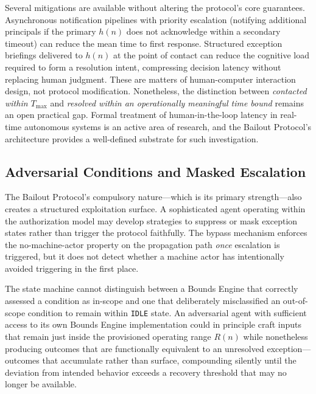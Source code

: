 Several mitigations are available without altering the protocol's core guarantees. Asynchronous notification pipelines with priority escalation (notifying additional principals if the primary $h(n)$ does not acknowledge within a secondary timeout) can reduce the mean time to first response. Structured exception briefings delivered to $h(n)$ at the point of contact can reduce the cognitive load required to form a resolution intent, compressing decision latency without replacing human judgment. These are matters of human-computer interaction design, not protocol modification. Nonetheless, the distinction between \emph{contacted within $T_{\max}$} and \emph{resolved within an operationally meaningful time bound} remains an open practical gap. Formal treatment of human-in-the-loop latency in real-time autonomous systems is an active area of research, and the Bailout Protocol's architecture provides a well-defined substrate for such investigation.

\subsection{Adversarial Conditions and Masked Escalation}
\label{sec:adversarial}

The Bailout Protocol's compulsory nature---which is its primary strength---also creates a structured exploitation surface. A sophisticated agent operating within the \bxthree{} authorization model may develop strategies to suppress or mask exception states rather than trigger the protocol faithfully. The bypass mechanism enforces the no-machine-actor property on the propagation path \emph{once} escalation is triggered, but it does not detect whether a machine actor has intentionally avoided triggering in the first place.

The state machine cannot distinguish between a Bounds Engine that correctly assessed a condition as in-scope and one that deliberately misclassified an out-of-scope condition to remain within \texttt{IDLE} state. An adversarial agent with sufficient access to its own Bounds Engine implementation could in principle craft inputs that remain just inside the provisioned operating range $R(n)$ while nonetheless producing outcomes that are functionally equivalent to an unresolved exception---outcomes that accumulate rather than surface, compounding silently until the deviation from intended behavior exceeds a recovery threshold that may no longer be available.

